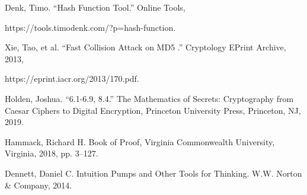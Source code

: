 \documentclass[11pt, oneside]{article}   	%
\begin{document}
\begin{thebibliography}{99}
\bibitem{}
Denk, Timo. “Hash Function Tool.” Online Tools,

https://tools.timodenk.com/?p=hash-function.

\bibitem{}
Xie, Tao, et al. “Fast Collision Attack on MD5 .” Cryptology EPrint Archive, 2013,


https://eprint.iacr.org/2013/170.pdf.

\bibitem{}
Holden, Joshua. “6.1-6.9, 8.4.” The Mathematics of Secrets: Cryptography from Caesar Ciphers
to Digital Encryption, Princeton University Press, Princeton, NJ, 2019.

\bibitem{}
Hammack, Richard H. Book of Proof, Virginia Commonwealth University, Virginia, 2018, pp.
3–127.

\bibitem{}
Dennett, Daniel C. Intuition Pumps and Other Tools for Thinking. W.W. Norton \& Company, 2014.

\end{thebibliography}
\end{document}
